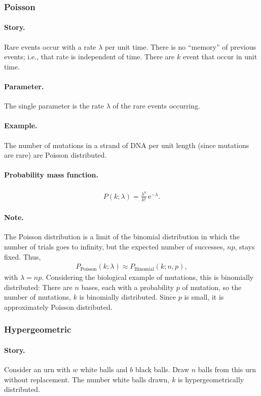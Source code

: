 \subsubsection{Poisson}
\paragraph{Story.}  Rare events occur with a rate $\lambda$ per unit
time.  There is no ``memory'' of previous events; i.e., that rate is
independent of time.  There are $k$ event that occur in unit time.
\paragraph{Parameter.} The single parameter is the rate $\lambda$ of
the rare events occurring.
\paragraph{Example.} The number of mutations in a strand of DNA per
unit length (since mutations are rare) are Poisson distributed.
\paragraph{Probability mass function.}
\begin{align}
P(k;\lambda) = \frac{\lambda^k}{k!}\,\mathrm{e}^{-\lambda}.
\end{align}
\paragraph{Note.}
The Poisson distribution is a limit of the binomial distribution in
which the number of trials goes to infinity, but the expected number
of successes, $np$, stays fixed.  Thus, 
\begin{align}
P_\mathrm{Poisson}(k;\lambda) \approx P_\mathrm{Binomial}(k;n, p),
\end{align}
with $\lambda = np$.  Considering the biological example of mutations,
this is binomially distributed: There are $n$ bases, each with a
probability $p$ of mutation, so the number of mutations, $k$ is
binomially distributed.  Since $p$ is small, it is approximately
Poisson distributed.


\subsubsection{Hypergeometric}
\paragraph{Story.} Consider an urn with $w$ white balls and $b$ black
balls.  Draw $n$ balls from this urn without replacement.  The number
white balls drawn, $k$ is hypergeometrically distributed.
